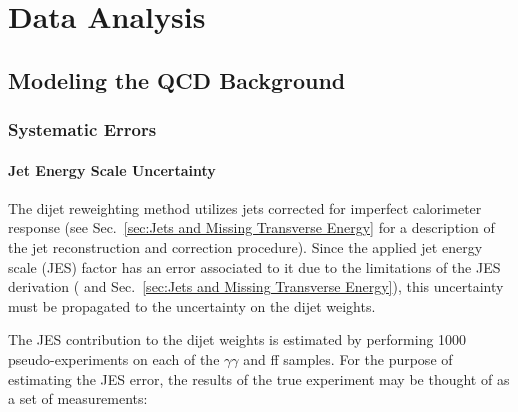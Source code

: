 \documentclass[dissertation.tex]{subfiles}
\begin{document}
\chapter{Data Analysis}
\label{chap:Data Analysis}
\section{Modeling the QCD Background}
\label{sec:Modeling the QCD Background}
\subsection{Systematic Errors}

\subsubsection{Jet Energy Scale Uncertainty}

The dijet \pT reweighting method utilizes jets corrected for imperfect calorimeter response (see Sec.~\ref{sec:Jets and Missing Transverse Energy} for a description of the jet reconstruction and correction procedure).  Since the applied jet energy scale (JES) factor has an error associated to it due to the limitations of the JES derivation (\cite{CMS_JES_paper} and Sec.~\ref{sec:Jets and Missing Transverse Energy}), this uncertainty must be propagated to the uncertainty on the dijet \pT weights.

The JES contribution to the dijet \pT weights is estimated by performing 1000 pseudo-experiments on each of the $\gamma\gamma$ and ff samples.  For the purpose of estimating the JES error, the results of the true experiment may be thought of as a set of measurements:
\end{document}
